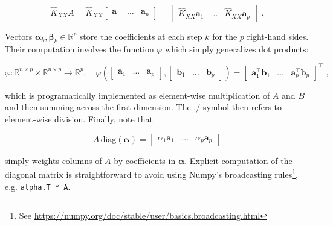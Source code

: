\documentclass{article}
\newcommand{\vect}[1]{\boldsymbol{\mathbf{#1}}}
\newcommand{\R}{\mathbb R}
\begin{document}
\begin{equation*}
    \widehat K_{XX} A = \widehat K_{XX} \begin{bmatrix}
    \vect a_1 & \dots & \vect a_p
    \end{bmatrix}  = \begin{bmatrix}
    \widehat K_{XX} \vect a_1 & \dots & \widehat K_{XX} \vect a_p
    \end{bmatrix} \; .
\end{equation*}

Vectors $\vect \alpha_k, \vect \beta_k \in \R^{p}$ store the coefficients at each step $k$ for the $p$ right-hand sides. Their computation involves the function $\varphi$ which simply generalizes dot products:

\begin{equation*}
    \varphi: \R^{n \times p} \times \R^{n \times p} \to \R^{p}, \quad
    \varphi(\begin{bmatrix}
    \vect a_1 & \dots & \vect a_p
    \end{bmatrix}, \begin{bmatrix}
    \vect b_1 & \dots & \vect b_p
    \end{bmatrix})
    = \begin{bmatrix}
    \vect a_1^\top \vect b_1 & \dots & \vect a_p^\top \vect b_p
    \end{bmatrix}^\top \; ,
\end{equation*}

which is programatically implemented as element-wise multiplication of $A$ and $B$ and then summing across the first dimension. The $./$ symbol then refers to element-wise division. Finally, note that 

\begin{equation*}
    A \, \text{diag}(\vect\alpha) = \begin{bmatrix} \alpha_1 \vect a_1 & \dots & \alpha_p \vect a_p \end{bmatrix}
\end{equation*}

simply weights columns of $A$ by coefficients in $\vect\alpha$. Explicit computation of the diagonal matrix is straightforward to avoid using Numpy's broadcasting rules\footnote{See \url{https://numpy.org/doc/stable/user/basics.broadcasting.html}}, e.g. \texttt{alpha.T * A}. 
\end{document}
